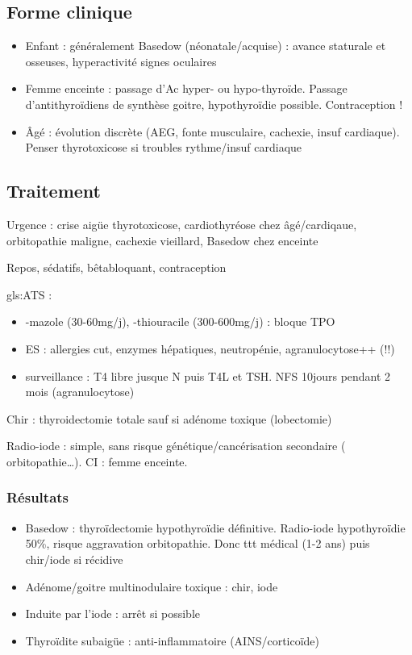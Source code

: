 \documentclass{book}
\begin{document}
\subsection{Forme clinique}
\label{sec:orgd0f06f0}
\begin{itemize}
\item Enfant : généralement Basedow (néonatale/acquise) : avance staturale et
osseuses, hyperactivité \textpm{} signes oculaires
\item Femme enceinte : passage d'Ac \thus hyper- ou hypo-thyroïde. Passage
d'antithyroïdiens de synthèse \thus goitre, hypothyroïdie possible. Contraception !
\item Âgé : évolution discrète (AEG, fonte musculaire, cachexie, insuf
cardiaque). Penser thyrotoxicose si troubles rythme/insuf cardiaque
\end{itemize}

\subsection{Traitement}
\label{sec:orgad1f761}
\faBomb{} Urgence : crise aigüe thyrotoxicose, cardiothyréose chez âgé/cardiqaue,
orbitopathie maligne, cachexie vieillard, Basedow chez \female{} enceinte

Repos, sédatifs, bêtabloquant, contraception

gls:ATS :
\begin{itemize}
\item -mazole (30-60mg/j), -thiouracile (300-600mg/j) : bloque TPO
\item ES : allergies cut, \inc enzymes hépatiques, neutropénie, agranulocytose++
(\faBomb !!)
\item surveillance : T4 libre jusque N puis T4L et TSH. NFS 10jours pendant 2 mois (agranulocytose)
\end{itemize}

Chir : thyroidectomie totale sauf si adénome toxique (lobectomie)

Radio-iode : simple, sans risque génétique/cancérisation secondaire (\danger{} orbitopathie\ldots{}). CI : femme enceinte.

\subsubsection{Résultats}
\label{sec:org9e1f7e4}
\begin{itemize}
\item Basedow : thyroïdectomie \thus hypothyroïdie définitive. Radio-iode \thus
hypothyroïdie 50\%, risque aggravation orbitopathie. Donc ttt médical (1-2
ans) puis chir/iode si récidive
\item Adénome/goitre multinodulaire toxique : chir, iode
\item Induite par l'iode : arrêt si possible
\item Thyroïdite subaigüe : anti-inflammatoire (AINS/corticoïde)
\end{itemize}
\end{document}
